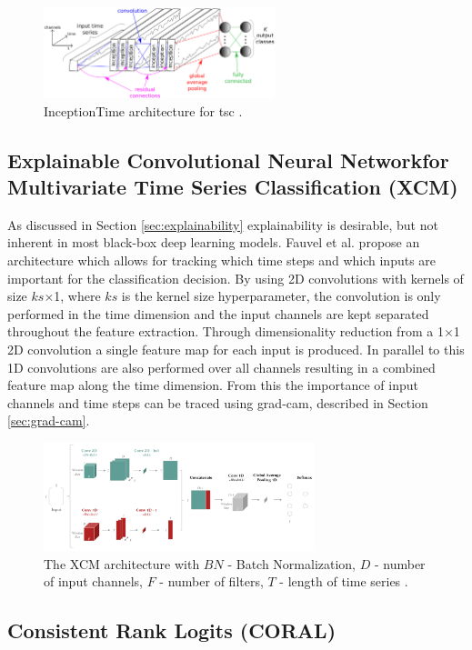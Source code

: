 \begin{figure}
  \centering
  \includegraphics[width=0.6\textwidth]{files/figs/inceptiontime.png}
  \caption{InceptionTime architecture for \gls{tsc} \cite{IsmailFawaz2020}.}
  \label{fig:inceptiontime}
\end{figure}

\subsection{Explainable Convolutional Neural Networkfor Multivariate Time Series Classification (XCM)}
As discussed in Section \ref{sec:explainability} explainability is desirable, but not inherent in most black-box deep learning models. Fauvel et al. \cite{Fauvel2020} propose an architecture which allows for tracking which time steps and which inputs are important for the classification decision. By using 2D convolutions with kernels of size $ks$$\times$1, where $ks$ is the kernel size hyperparameter, the convolution is only performed in the time dimension and the input channels are kept separated throughout the feature extraction. Through dimensionality reduction from a 1$\times$1 2D convolution a single feature map for each input is produced. In parallel to this 1D convolutions are also performed over all channels resulting in a combined feature map along the time dimension. From this the importance of input channels and time steps can be traced using \gls{grad-cam}, described in Section \ref{sec:grad-cam}.


\begin{figure}
  \centering
  \includegraphics[width=0.7\textwidth]{files/figs/xcm.png}
  \caption{The XCM architecture with $BN$ - Batch Normalization, $D$ - number of input channels, $F$ - number of filters, $T$ - length of time series \cite{Fauvel2020}.}
  \label{fig:xcm}
\end{figure}

\subsection{Consistent Rank Logits (CORAL)}
